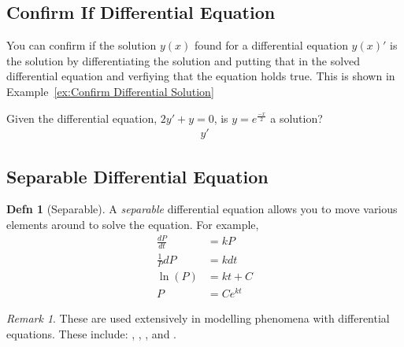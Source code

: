 \documentclass[10pt,letterpaper,final,twoside,notitlepage]{article}
\theoremstyle{plain}
\theoremstyle{definition}
\newtheorem{definition}{Defn}
\theoremstyle{remark}
\newtheorem{remark}{Remark}[definition]
\begin{document}
	\subsection{Confirm If Differential Equation} \label{subsec:Confirm Differential Equation}
	You can confirm if the solution $y \left( x \right)$ found for a differential equation $y \left( x \right)'$ is the solution by differentiating the solution and putting that in the solved differential equation and verfiying that the equation holds true.
	This is shown in Example~\ref{ex:Confirm Differential Solution}
	\begin{example}{} \label{ex:Confirm Differential Solution}
		Given the differential equation, $2y' + y = 0$, is $y = e^{\frac{-x}{2}}$ a solution? \newline
		\begin{align*}
			y'%
		\end{align*}
	\end{example}
		
	\subsection{Separable Differential Equation} \label{subsec:Separable Differential Equation}
		\begin{definition}[Separable] \label{def:Separable}
			A \emph{separable} differential equation allows you to move various elements around to solve the equation.
			For example,
			\begin{align*}
				\frac{dP}{dt} &= kP \\
				\frac{1}{P} dP &= k dt \\
				\ln \left( P \right) &= kt + C \\
				P &= Ce^{kt}
			\end{align*}
			\begin{remark}
				These are used extensively in modelling phenomena with differential equations.
				These include: , , , and .
			\end{remark}
		\end{definition}
		
\end{document}
